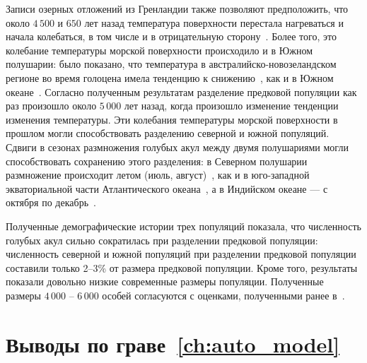 Записи озерных отложений из Гренландии также позволяют предположить, что около $4{\,}500$ и $650$ лет назад температура поверхности перестала нагреваться и начала колебаться, в том числе и в отрицательную сторону~\cite{masson2013information, olsen2012variability}.
Более того, это колебание температуры морской поверхности происходило и в Южном полушарии: было показано, что температура в австралийско-новозеландском регионе во время голоцена имела тенденцию к снижению~\cite{bostock2013review}, как и в Южном океане~\cite{kaiser2008glacial,shevenell2011holocene}.
Согласно полученным результатам разделение предковой популяции как раз произошло около $5{\,}000$ лет назад, когда произошло изменение тенденции изменения температуры.
Эти колебания температуры морской поверхности в прошлом могли способствовать разделению северной и южной популяций.
Сдвиги в сезонах размножения голубых акул между двумя полушариями могли способствовать сохранению этого разделения: в Северном полушарии размножение происходит летом (июль, август)~\cite{fujinami2017reproductive}, как и в юго-западной экваториальной части Атлантического океана~\cite{coelho2018distribution}, а в Индийском океане --- с октября по декабрь~\cite{druon2022global}.


Полученные демографические истории трех популяций показала, что численность голубых акул сильно сократилась при разделении предковой популяции: численность северной и южной популяций при разделении предковой популяции составили только 2--3\% от размера предковой популяции.
Кроме того, результаты показали довольно низкие современные размеры популяции.
Полученные размеры $4{\,}000$ -- $6{\,}000$ особей согласуются с оценками, полученными ранее в~\cite{verissimo2017world,king2015genetic}.


\section*{Выводы по граве~\ref{ch:auto_model}}

